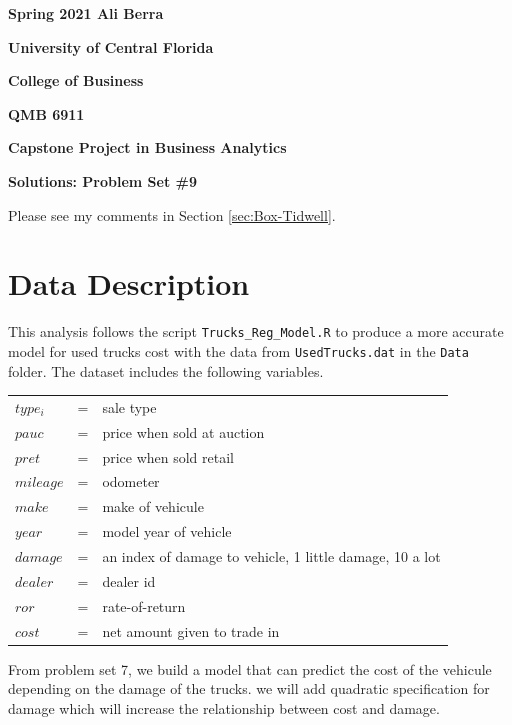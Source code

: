 \documentclass[11pt]{paper}
\begin{document}

\pagestyle{empty}
{\noindent\bf Spring 2021 \hfill Ali Berra}
\vskip 16pt
\centerline{\bf University of Central Florida}
\centerline{\bf College of Business}
\vskip 16pt
\centerline{\bf QMB 6911}
\centerline{\bf Capstone Project in Business Analytics}
\vskip 10pt
\centerline{\bf Solutions:  Problem Set \#9}
\vskip 32pt
\noindent
% 

{\color{red}
Please see my comments in
Section \ref{sec:Box-Tidwell}.
}

\section{Data Description}

This analysis follows the script \texttt{Trucks\_Reg\_Model.R} to produce a more accurate model for used trucks cost with the data from \texttt{UsedTrucks.dat} in the \texttt{Data} folder. 
The dataset includes the following variables.
\begin{table}[h!]
\begin{tabular}{l l l}

$type_i$ & = & sale type \\

$pauc$ & = & price when sold at auction \\
$ pret$ & = &price when sold retail \\ 
$mileage$ & = & odometer \\ %
$make$ & = &make of vehicule \\
$year$ & = &model year of vehicle \\ 
$damage$ & = & an index of damage to vehicle, 1 little damage, 10 a lot\\
$dealer$ & = & dealer id \\ 
$ror$& = &rate-of-return\\
$cost$& = &net amount given to trade in\\


\end{tabular}
\end{table}
%
From problem set 7, we build a model that can predict the cost of the vehicule depending 
on the damage of the trucks. we will add quadratic specification for damage 
which will increase the relationship between cost and damage. 



\clearpage
\end{document}
